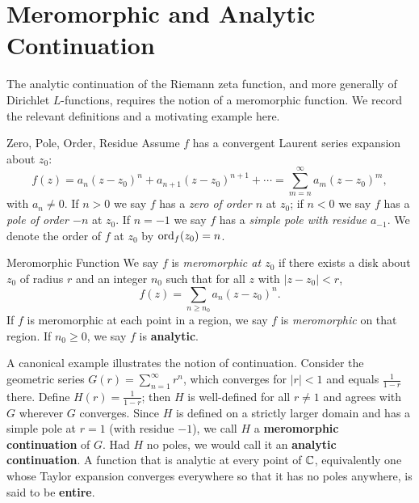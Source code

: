 \section{Meromorphic and Analytic Continuation}\label{sec:meromorphic-analytic}

The analytic continuation of the Riemann zeta function, and more generally of Dirichlet $L$-functions, requires the notion of a meromorphic function. We record the relevant definitions and a motivating example here.

\begin{Definition}{Zero, Pole, Order, Residue}{}
  Assume $f$ has a convergent Laurent series expansion about $z_0$:
  $$f(z) = a_n(z-z_0)^n + a_{n+1}(z-z_0)^{n+1} + \cdots = \sum_{m=n}^{\infty} a_m(z-z_0)^m,$$
  with $a_n \neq 0$. If $n > 0$ we say $f$ has a \emph{zero of order $n$} at $z_0$; if $n < 0$ we say $f$ has a \emph{pole of order $-n$} at $z_0$. If $n = -1$ we say $f$ has a \emph{simple pole with residue $a_{-1}$}. We denote the order of $f$ at $z_0$ by $\operatorname{ord}_f(z_0) = n$.
\end{Definition}

\begin{Definition}{Meromorphic Function}{}
  We say $f$ is \emph{meromorphic at $z_0$} if there exists a disk about $z_0$ of radius $r$ and an integer $n_0$ such that for all $z$ with $|z - z_0| < r$,
  $$f(z) = \sum_{n \geq n_0} a_n(z-z_0)^n.$$
  If $f$ is meromorphic at each point in a region, we say $f$ is \emph{meromorphic} on that region. If $n_0 \geq 0$, we say $f$ is \textbf{analytic}.
\end{Definition}

A canonical example illustrates the notion of continuation. Consider the geometric series $G(r) = \sum_{n=1}^{\infty} r^n$, which converges for $|r| < 1$ and equals $\frac{1}{1-r}$ there. Define $H(r) = \frac{1}{1-r}$; then $H$ is well-defined for all $r \neq 1$ and agrees with $G$ wherever $G$ converges. Since $H$ is defined on a strictly larger domain and has a simple pole at $r = 1$ (with residue $-1$), we call $H$ a \textbf{meromorphic continuation} of $G$. Had $H$ no poles, we would call it an \textbf{analytic continuation}. A function that is analytic at every point of $\mathbb{C}$, equivalently one whose Taylor expansion converges everywhere so that it has no poles anywhere, is said to be \textbf{entire}.

